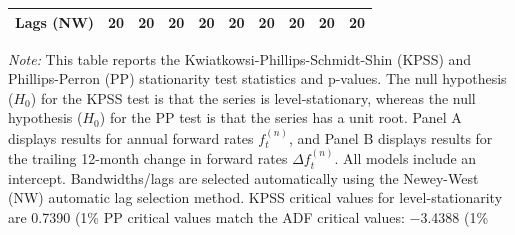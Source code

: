\begin{table}[tbp]
\begin{tabular}{lccccccccc}
      Lags (NW)        &       20 &       20 &       20 &       20 &       20 &       20 &       20 &       20 &       20 \\
    \bottomrule
  \end{tabular}
  \begin{tablenotes}[flushleft]
    \small
    \item \textit{Note:} This table reports the Kwiatkowsi-Phillips-Schmidt-Shin (KPSS) and Phillips-Perron (PP) stationarity test statistics and p-values.
    The null hypothesis ($H_0$) for the KPSS test is that the series is level-stationary, whereas the null hypothesis ($H_0$) for the PP test is that the series has a unit root.
    Panel A displays results for annual forward rates $f_t^{(n)}$, and Panel B displays results for the trailing 12-month change in forward rates $\Delta f_t^{(n)}$.
    All models include an intercept. Bandwidths/lags are selected automatically using the Newey-West (NW) automatic lag selection method.
    KPSS critical values for level-stationarity are 0.7390 (1\%%
    PP critical values match the ADF critical values: $-$3.4388 (1\%%
  \end{tablenotes}
\end{table}
